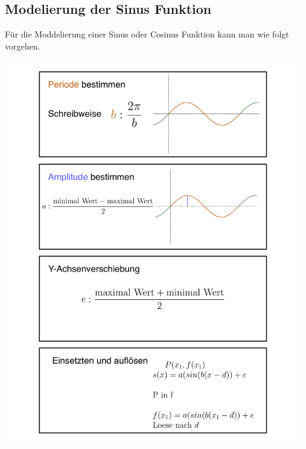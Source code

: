 \subsection{Modelierung der Sinus Funktion}\label{sec:Trigonometrie/Modelierung der Sinus Funktion}
Für die Moddelierung einer Sinus oder Cosinus Funktion kann man wie folgt vorgehen.

\includegraphics[width=13cm]{Media/Modelierung_von_Sinus_Algorythmus}


